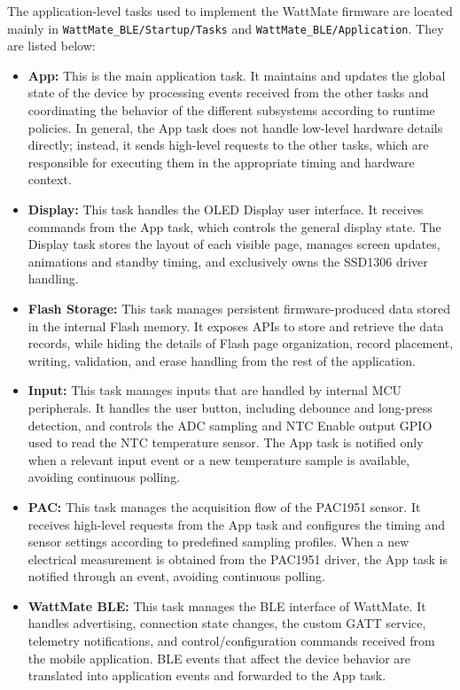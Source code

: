 The application-level tasks used to implement the WattMate firmware are located mainly in 
\texttt{WattMate\_BLE/Startup/Tasks} and \texttt{WattMate\_BLE/Application}. 
They are listed below:

\begin{itemize}
	\item \textbf{App:}
	This is the main application task. It maintains and updates the global state of the device by processing events received from the other tasks and coordinating the behavior of the different subsystems according to runtime policies. In general, the App task does not handle low-level hardware details directly; instead, it sends high-level requests to the other tasks, which are responsible for executing them in the appropriate timing and hardware context.
	
	\item \textbf{Display:}
	This task handles the OLED Display user interface. It receives commands from the App task, which controls the general display state. The Display task stores the layout of each visible page, manages screen updates, animations and standby timing, and exclusively owns the SSD1306 driver handling.
	
	\item \textbf{Flash Storage:}
	This task manages persistent firmware-produced data stored in the internal Flash memory. It exposes APIs to store and retrieve the data records, while hiding the details of Flash page organization, record placement, writing, validation, and erase handling from the rest of the application.
	
	\item \textbf{Input:}
	This task manages inputs that are handled by internal MCU peripherals. It handles the user button, including debounce and long-press detection, and controls the ADC sampling and NTC Enable output GPIO used to read the NTC temperature sensor. The App task is notified only when a relevant input event or a new temperature sample is available, avoiding continuous polling.
	
	\item \textbf{PAC:}
	This task manages the acquisition flow of the PAC1951 sensor. It receives high-level requests from the App task and configures the timing and sensor settings according to predefined sampling profiles. When a new electrical measurement is obtained from the PAC1951 driver, the App task is notified through an event, avoiding continuous polling.
	
	\item \textbf{WattMate BLE:}
	This task manages the BLE interface of WattMate. It handles advertising, connection state changes, the custom GATT service, telemetry notifications, and control/configuration commands received from the mobile application. BLE events that affect the device behavior are translated into application events and forwarded to the App task.
	
	
\end{itemize}

